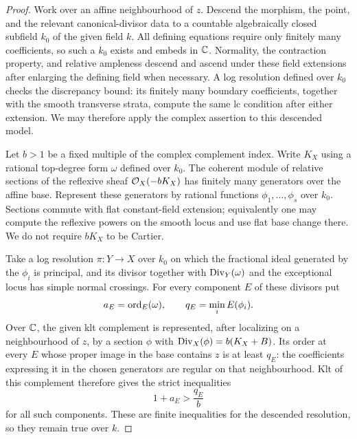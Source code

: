 \begin{proof}
Work over an affine neighbourhood of $z$. Descend the morphism, the point,
and the relevant canonical-divisor data to a countable algebraically closed
subfield $k_0$ of the given field $k$. All defining equations require only
finitely many coefficients, so such a $k_0$ exists and embeds in $\mathbb C$.
Normality, the contraction property, and relative ampleness descend and
ascend under these field extensions after enlarging the defining field when
necessary. A log resolution defined over $k_0$ checks the discrepancy bound:
its finitely many boundary coefficients, together with the smooth transverse
strata, compute the same lc condition after either extension. We may
therefore apply the complex assertion to this descended model.

Let $b>1$ be a fixed multiple of the complex complement index. Write $K_X$
using a rational top-degree form $\omega$ defined over $k_0$. The coherent
module of relative sections of the reflexive sheaf $\mathcal O_X(-bK_X)$ has
finitely many generators over the affine base. Represent these generators
by rational functions $\phi_1,\ldots,\phi_s$ over $k_0$. Sections commute
with flat constant-field extension; equivalently one may compute the
reflexive powers on the smooth locus and use flat base change there.
We do not require $bK_X$ to be Cartier.

Take a log resolution $\pi\colon Y\to X$ over $k_0$ on which the fractional ideal
generated by the $\phi_i$ is principal, and its divisor together with
$\operatorname{Div}_Y(\omega)$ and the exceptional locus has simple normal crossings.
For every component $E$ of these divisors put
\[
 a_E=\operatorname{ord}_E(\omega),\qquad
 q_E=\min_i E(\phi_i).
\]
Over $\mathbb C$, the given klt complement is represented, after localizing on a
neighbourhood of $z$, by a section $\phi$ with
$\operatorname{Div}_X(\phi)=b(K_X+B)$. Its order at every $E$ whose proper image in the
base contains $z$ is at least $q_E$: the coefficients expressing it in the
chosen generators are regular on that neighbourhood. Klt of this complement
therefore gives the strict inequalities
\begin{equation}\label{eq:descent-fixed-part}
 1+a_E>\frac{q_E}{b}
\end{equation}
for all such components. These are finite inequalities for the descended
resolution, so they remain true over $k$.


\end{proof}
